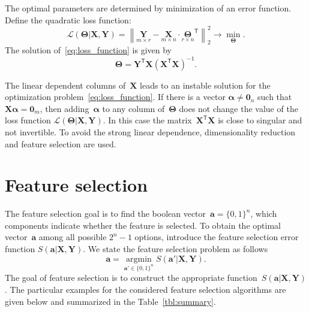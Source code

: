 \documentclass[12pt,twoside]{article}
\theoremstyle{definition}
\newcommand{\ba}{\mathbf{a}}
\newcommand{\bY}{\mathbf{Y}}
\newcommand{\bX}{\mathbf{X}}
\newcommand{\T}{\mathsf{T}}
\newcommand{\bTheta}{\boldsymbol{\Theta}}
\newcommand{\bZero}{\boldsymbol{0}}
\newcommand{\argmin}{\mathop{\arg \min}\limits}
\begin{document}
The optimal parameters are determined by minimization of an error function.
Define the quadratic loss function:
\begin{equation}
\mathcal{L}(\bTheta | \bX, \bY) = {\left\| \underset{m \times r}{\mathbf{Y}}  - \underset{m \times n}{\bX} \cdot \underset{r \times n}{\bTheta}^{\T} \right\| }_2^2 \rightarrow\min_{\bTheta}.
\label{eq:loss_function}
\end{equation}
The solution of~\eqref{eq:loss_function} is given by
\begin{equation*}
\bTheta = \bY^{\T} \bX (\bX^{\T} \bX)^{-1}.
\end{equation*}

The linear dependent columns of~$\bX$ leads to an instable solution for the optimization problem~\eqref{eq:loss_function}.
If there is a vector $\boldsymbol{\alpha} \neq \bZero_n$ such that $\bX \boldsymbol{\alpha}= \bZero_m$, then adding~$\boldsymbol{\alpha}$ to any column of~$\bTheta$ does not change the value of the loss function $\mathcal{L}(\bTheta | \bX, \bY)$.
In this case the matrix~$\bX^{\T} \bX$ is close to singular and not invertible.
To avoid the strong linear dependence, dimensionality reduction and feature selection are used.

\section{Feature selection}

The feature selection goal is to find the boolean vector~$\ba = \{0, 1\}^n$, which components indicate whether the feature is selected. 
To obtain the optimal vector~$\ba$ among all possible $2^n - 1$ options, introduce the feature selection error function $S(\ba | \bX, \bY)$. 
We state the feature selection problem as follows 
\begin{equation}
\ba = \argmin_{\ba' \in \{0, 1\}^n} S(\ba' | \bX, \bY).
\label{eq:feature_selection}
\end{equation}
The goal of feature selection is to construct the appropriate function~$S(\ba | \bX, \bY)$. The particular examples for the considered feature selection algorithms are given below and summarized in the Table~\ref{tbl:summary}.
\end{document}
